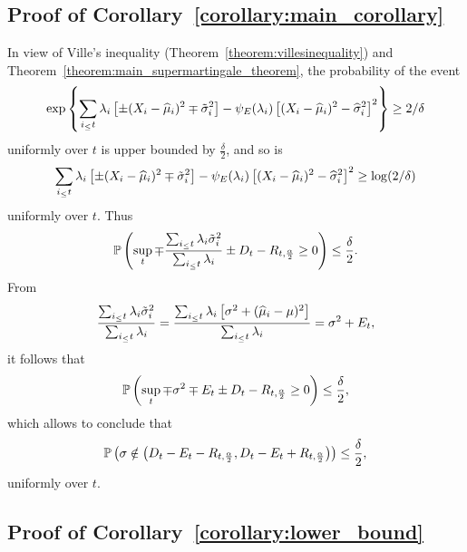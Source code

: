 \subsection{Proof of Corollary~\ref{corollary:main_corollary}} \label{proof:main_corollary}

In view of Ville's inequality (Theorem~\ref{theorem:villesinequality}) and Theorem~\ref{theorem:main_supermartingale_theorem}, the probability of the event
\begin{align*}
     \exp \left\{ \sum_{i_\leq t} \lambda_i \left[\pm (X_i - \widehat\mu_i)^2 \mp \tilde\sigma_i^2  \right] - \psi_E(\lambda_i) \left[ (X_i - \widehat\mu_i)^2 - \widehat \sigma_i^2 \right]^2 \right\} \geq 2/\delta 
\end{align*}
uniformly over $t$ is upper bounded by $\frac{\delta}{2}$, and so is
\begin{align*}
      \sum_{i_\leq t} \lambda_i \left[\pm (X_i - \widehat\mu_i)^2 \mp \tilde\sigma_i^2  \right] - \psi_E(\lambda_i) \left[ (X_i - \widehat\mu_i)^2 - \widehat \sigma_i^2 \right]^2  \geq \log (2/\delta) 
\end{align*}
uniformly over $t$. Thus
\begin{align*}
    \mathbb{P} \left( \sup_t \mp \frac{\sum_{i_\leq t} \lambda_i  \tilde\sigma_i^2}{\sum_{i_\leq t} \lambda_i  } \pm D_t  - R_{t, \frac{\alpha}{2}} \geq 0\right) \leq \frac{\delta}{2}.
\end{align*}
From
\begin{align*}
    \frac{\sum_{i_\leq t} \lambda_i  \tilde\sigma_i^2}{\sum_{i_\leq t} \lambda_i  } = \frac{\sum_{i_\leq t} \lambda_i  \left[\sigma^2 + (\widehat\mu_i - \mu)^2\right]}{\sum_{i_\leq t} \lambda_i} = \sigma^2 + E_t,
\end{align*}
it follows that
\begin{align*}
    \mathbb{P} \left( \sup_t \mp \sigma^2 \mp E_t \pm D_t  - R_{t, \frac{\alpha}{2}} \geq 0\right) \leq \frac{\delta}{2},
\end{align*}
which allows to conclude that 
\begin{align*}
    \mathbb{P} \left( \sigma \notin \left( D_t - E_t - R_{t, \frac{\alpha}{2}} ,  D_t - E_t + R_{t, \frac{\alpha}{2}}\right) \right)  \leq \frac{\delta}{2},
\end{align*}
uniformly over $t$.





\subsection{Proof of Corollary~\ref{corollary:lower_bound}} \label{proof:lower_bound}

